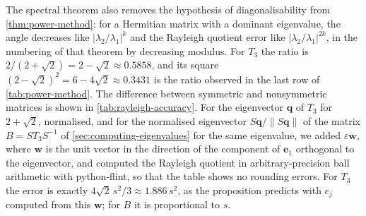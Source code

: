 The spectral theorem also removes the hypothesis of diagonalisability from \cref{thm:power-method}: for a Hermitian matrix with a dominant eigenvalue, the angle decreases like $|\lambda_2/\lambda_1|^k$ and the Rayleigh quotient error like $|\lambda_2/\lambda_1|^{2k}$, in the numbering of that theorem by decreasing modulus. For $T_3$ the ratio is $2/(2+\sqrt2)=2-\sqrt2\approx0.5858$, and its square $(2-\sqrt2)^2=6-4\sqrt2\approx0.3431$ is the ratio observed in the last row of \cref{tab:power-method}. The difference between symmetric and nonsymmetric matrices is shown in \cref{tab:rayleigh-accuracy}. For the eigenvector $\mathbf q$ of $T_3$ for $2+\sqrt2$, normalised, and for the normalised eigenvector $S\mathbf q/\|S\mathbf q\|$ of the matrix $B=ST_3S^{-1}$ of \cref{sec:computing-eigenvalues} for the same eigenvalue, we added $\varepsilon\mathbf w$, where $\mathbf w$ is the unit vector in the direction of the component of $\mathbf e_1$ orthogonal to the eigenvector, and computed the Rayleigh quotient in arbitrary-precision ball arithmetic with python-flint, so that the table shows no rounding errors. For $T_3$ the error is exactly $4\sqrt2\,s^2/3\approx1.886\,s^2$, as the proposition predicts with $c_j$ computed from this $\mathbf w$; for $B$ it is proportional to $s$.

\begin{table}
\end{table}

